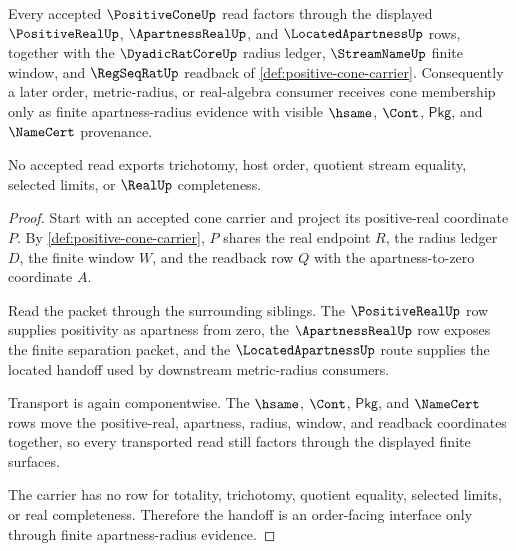 \begin{theorem}
\label{thm:positive-cone-apartness-order-handoff}
Every accepted $\PositiveConeUp$ read factors through the displayed
$\PositiveRealUp$, $\ApartnessRealUp$, and $\LocatedApartnessUp$ rows, together
with the $\DyadicRatCoreUp$ radius ledger, $\StreamNameUp$ finite window, and
$\RegSeqRatUp$ readback of \autoref{def:positive-cone-carrier}. Consequently a
later order, metric-radius, or real-algebra consumer receives cone membership
only as finite apartness-radius evidence with visible $\hsame$, $\Cont$,
$\mathsf{Pkg}$, and $\NameCert$ provenance.

No accepted read exports trichotomy, host order, quotient stream equality,
selected limits, or $\RealUp$ completeness.
\end{theorem}
\begin{proof}
Start with an accepted cone carrier and project its positive-real coordinate
$P$. By \autoref{def:positive-cone-carrier}, $P$ shares the real endpoint $R$,
the radius ledger $D$, the finite window $W$, and the readback row $Q$ with the
apartness-to-zero coordinate $A$.

Read the packet through the surrounding siblings. The $\PositiveRealUp$ row
supplies positivity as apartness from zero, the $\ApartnessRealUp$ row exposes
the finite separation packet, and the $\LocatedApartnessUp$ route supplies the
located handoff used by downstream metric-radius consumers.

Transport is again componentwise. The $\hsame$, $\Cont$, $\mathsf{Pkg}$, and
$\NameCert$ rows move the positive-real, apartness, radius, window, and
readback coordinates together, so every transported read still factors through
the displayed finite surfaces.

The carrier has no row for totality, trichotomy, quotient equality, selected
limits, or real completeness. Therefore the handoff is an order-facing
interface only through finite apartness-radius evidence.
\end{proof}


\begin{closurestatus}{\PositiveConeUp}
  \theoryclosure{\seedClosure}
  \formalstatus{\unformalizedV}
\end{closurestatus}
